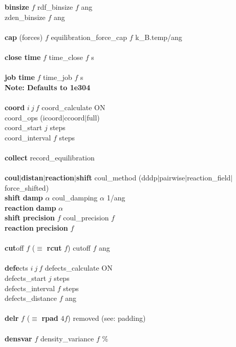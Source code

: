 \begin{tabbing}
\>    {\bf binsize} $f$ \> rdf\_binsize $f$ ang \\
\> \> zden\_binsize $f$ ang \\\\
\>    {\bf cap} (forces) $f$  \> equilibration\_force\_cap $f$ k\_B.temp/ang \\\\
\>    {\bf close time} $f$ \> time\_close $f$ s \\\\
\>    {\bf job time} $f$ \> time\_job $f$ s \\
\> \> {\bf Note: Defaults to 1e304} \\\\
\>    {\bf coord} $i~j~f$ \> coord\_calculate ON \\
\> \> coord\_ops (icoord$|$ccoord$|$full) \\
\> \> coord\_start $j$ steps \\
\> \> coord\_interval $f$ steps \\\\
\>    {\bf collect} \> record\_equilibration \\\\
\>    {\bf coul}$|${\bf distan}$|${\bf reaction}$|${\bf shift} \> coul\_method (dddp$|$pairwise$|$reaction\_field$|$force\_shifted) \\
\>    {\bf shift} {\bf damp} $\alpha{}$ \> coul\_damping $\alpha{}$ 1/ang \\
\>    {\bf reaction} {\bf damp} $\alpha{}$ \> \\
\>    {\bf shift} {\bf precision} $f$ \> coul\_precision $f$  \\
\>    {\bf reaction} {\bf precision} $f$ \> \\\\
\>    {\bf cut}off $f$ ($\equiv$ {\bf rcut} $f$) \> cutoff $f$ ang \\\\
\>    {\bf defe}cts $i~j~f$ \> defects\_calculate ON  \\
\> \> defects\_start $j$ steps \\
\> \> defects\_interval $f$ steps \\
\> \> defects\_distance $f$ ang \\\\
\>    {\bf delr} $f$  ($\equiv$ {\bf rpad} $4f$) \> removed (see: padding) \\\\
\>    {\bf densvar} $f$ \> density\_variance $f$ \% \\\\

\end{tabbing}
